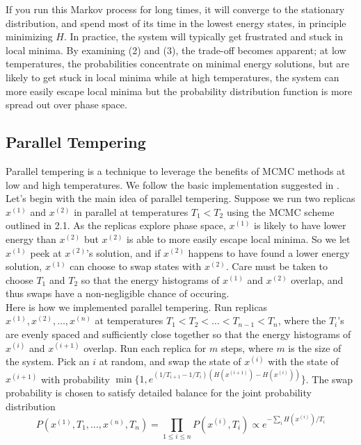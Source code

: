 \documentclass[12pt]{article}
\newcommand{\1}{\mathbf{1}}
\theoremstyle{remark}
\theoremstyle{definition}
\theoremstyle{proposition}
\theoremstyle{lemma}
\theoremstyle{definition}
\begin{document}
	If you run this Markov process for long times, it will converge to the stationary distribution, and spend most of its time in the lowest energy states, in principle minimizing $H$. In practice, the system will typically get frustrated and stuck in local minima. By examining (2) and (3), the trade-off becomes apparent; at low temperatures, the probabilities concentrate on minimal energy solutions, but are likely to get stuck in local minima while at high temperatures, the system can more easily escape local minima but the probability distribution function is more spread out over phase space.
	
	\subsection{Parallel Tempering}
	\indent \indent Parallel tempering is a technique to leverage the benefits of MCMC methods at low and high temperatures. We follow the basic implementation suggested in \cite{B509983H}. \\
	\indent Let's begin with the main idea of parallel tempering. Suppose we run two replicas $x^{(1)}$ and $x^{(2)}$ in parallel at temperatures $T_1 < T_2$ using the MCMC scheme outlined in 2.1. As the replicas explore phase space, $x^{(1)}$ is likely to have lower energy than $x^{(2)}$ but $x^{(2)}$ is able to more easily escape local minima. So we let $x^{(1)}$ peek at $x^{(2)}$'s solution, and if $x^{(2)}$ happens to have found a lower energy solution, $x^{(1)}$ can choose to swap states with $x^{(2)}$. Care must be taken to choose $T_1$ and $T_2$ so that the energy histograms of $x^{(1)}$ and $x^{(2)}$ overlap, and thus swaps have a non-negligible chance of occuring. \\
	\indent Here is how we implemented parallel tempering. Run replicas $x^{(1)}, x^{(2)}, \ldots, x^{(n)}$ at temperatures $T_1 < T_2 < \ldots < T_{n-1} < T_n$, where the $T_i$'s are evenly spaced and sufficiently close together so that the energy histograms of $x^{(i)}$ and $x^{(i+1)}$ overlap. Run each replica for $m$ steps, where $m$ is the size of the system. Pick an $i$ at random, and swap the state of  $x^{(i)}$ with the state of $x^{(i+1)}$ with probability $\min\{1, e^{(1/T_{i+1}-1/{T_i})(H(x^{(i+1)}) - H(x^{(i)}))}\}$. The swap probability is chosen to satisfy detailed balance for the joint probability distribution 
	$$P(x^{(1)}, T_1, \ldots, x^{(n)}, T_n) = \prod_{1\leq i \leq n} P(x^{(i)}, T_i) \propto e^{-\sum_i H(x^{(i)})/T_i}$$
\end{document}
